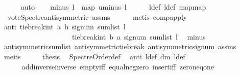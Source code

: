 \begin{isabellebody}
\ \ \ \ \isamarkupfalse%
\ auto\isanewline
\ \ \isamarkupfalse%
\ minus{\isacharcolon}{\kern0pt}\ {\isachardoublequoteopen}l{}\ {\isacharequal}{\kern0pt}\ map\ uminus\ l{\isachardoublequoteclose}\isanewline
\ \ \ \ \isamarkupfalse%
\ l{\isacharunderscore}{\kern0pt}def\ l{}{\isacharunderscore}{\kern0pt}def\ map{\isacharunderscore}{\kern0pt}map\isanewline
\ \ \ \ \isamarkupfalse%
\ \ vote{\isacharunderscore}{\kern0pt}Spectre{\isacharunderscore}{\kern0pt}antisymmetric\ assms{\isacharparenleft}{\kern0pt}{}{\isacharparenright}{\kern0pt}\isanewline
\ \ \ \ \isamarkupfalse%
\ {\isacharparenleft}{\kern0pt}metis\ comp{\isacharunderscore}{\kern0pt}apply{\isacharparenright}{\kern0pt}\ \ \isanewline
\ \ \isamarkupfalse%
\ anti{\isacharcolon}{\kern0pt}\ {\isachardoublequoteopen}tie{\isacharunderscore}{\kern0pt}break{\isacharunderscore}{\kern0pt}int\ a\ b\ {\isacharparenleft}{\kern0pt}signum\ {\isacharparenleft}{\kern0pt}sum{\isacharunderscore}{\kern0pt}list\ l{\isacharparenright}{\kern0pt}{\isacharparenright}{\kern0pt}\ {\isacharequal}{\kern0pt}\ \isanewline
\ \ \ \ \ \ \ \ \ \ \ \ \ \ \ \ \ \ \ {\isacharminus}{\kern0pt}\ tie{\isacharunderscore}{\kern0pt}break{\isacharunderscore}{\kern0pt}int\ b\ a\ {\isacharparenleft}{\kern0pt}signum\ {\isacharparenleft}{\kern0pt}sum{\isacharunderscore}{\kern0pt}list\ l{}{\isacharparenright}{\kern0pt}{\isacharparenright}{\kern0pt}{\isachardoublequoteclose}\ \isamarkupfalse%
\ minus\ \isanewline
\ \ \ \ \isamarkupfalse%
\ antisymmetric{\isacharunderscore}{\kern0pt}sumlist\ antisymmetric{\isacharunderscore}{\kern0pt}tie{\isacharunderscore}{\kern0pt}break\ antisymmetric{\isacharunderscore}{\kern0pt}signum\ assms{\isacharparenleft}{\kern0pt}{}{\isacharparenright}{\kern0pt}\ \isamarkupfalse%
\ metis\isanewline
\ \ \isamarkupfalse%
\ \isamarkupfalse%
\ {\isachardoublequoteopen}{\isacharquery}{\kern0pt}thesis{\isachardoublequoteclose}\ \isamarkupfalse%
\ Spectre{\isacharunderscore}{\kern0pt}Order{\isacharunderscore}{\kern0pt}def\ \isamarkupfalse%
\ anti\ l{\isacharunderscore}{\kern0pt}def\ dm\ l{}{\isacharunderscore}{\kern0pt}def\ \isanewline
\ \ \ \ \ \ add{\isachardot}{\kern0pt}inverse{\isacharunderscore}{\kern0pt}inverse\ empty{\isacharunderscore}{\kern0pt}iff\ equal{\isacharunderscore}{\kern0pt}neg{\isacharunderscore}{\kern0pt}zero\ insert{\isacharunderscore}{\kern0pt}iff\ zero{\isacharunderscore}{\kern0pt}neq{\isacharunderscore}{\kern0pt}one\isanewline

\end{isabellebody}
